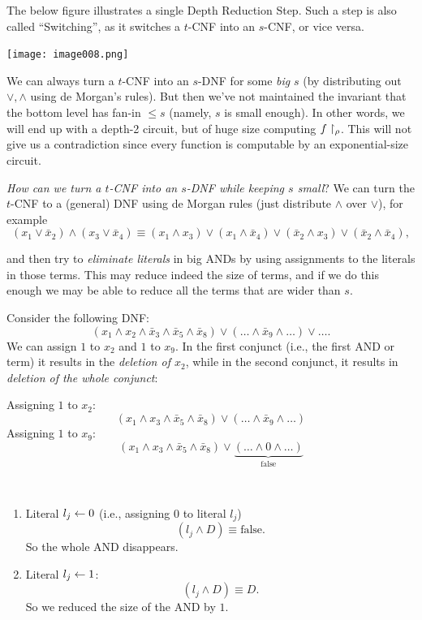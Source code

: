 The below figure illustrates a single Depth Reduction Step. Such a step is also called  ``Switching'', as it switches a $t$-CNF into an $s$-CNF, or vice versa.

\texttt{[image: image008.png]}

\begin{note} We can always turn a $t$-CNF into an $s$-DNF for some \textit{big} $s$ (by distributing out \(\lor, \land\) using de Morgan's rules).
But then we've not maintained the invariant that the bottom level has fan-in \(\leq s\) (namely, \(s\) is small enough).
In other words, we will end up with a depth-2 circuit, but of huge size computing \(f\upharpoonright_\rho\). This will not give us a contradiction since every function is computable by an exponential-size circuit.
\end{note}

\emph{How can we  turn a $t$-CNF into an $s$-DNF while keeping $s$ small}?
We can turn the $t$-CNF to a (general) DNF using de Morgan rules (just distribute $\wedge$ over $\vee$), for example
\[
(x_1 \vee \bar{x}_2) \wedge (x_3 \vee \bar{x}_4) \equiv (x_1 \wedge x_3) \vee (x_1 \wedge \bar{x}_4) \vee (\bar{x}_2 \wedge x_3) \vee (\bar{x}_2 \wedge \bar{x}_4),
\]

and then try to \emph{eliminate literals} in big ANDs by using assignments to the literals in those terms. This may reduce indeed the size of terms, and if we do this enough we may be able to reduce all the terms that are wider than $s$.
 
 
Consider the following DNF:
\[
(x_1 \wedge x_2 \wedge \bar{x}_3 \wedge \bar{x}_5 \wedge \bar{x}_8) \vee ( \dots \wedge \bar{x}_9 \wedge \dots)\lor\dots.
\] We can assign $1$ to $x_2$ and $1$ to $x_9$. In the first conjunct (i.e., the first AND or term) it results in the \emph{deletion of $x_2$}, while in the second conjunct, it results in \emph{deletion of the whole conjunct}:

Assigning $1$ to $x_2$:
\[
(x_1 \wedge x_3 \wedge \bar{x}_5 \wedge \bar{x}_8) \vee ( \dots \wedge \bar{x}_9 \wedge \dots )
\]
Assigning $1$ to $x_9$:
\[
(x_1 \wedge x_3 \wedge \bar{x}_5 \wedge \bar{x}_8) \vee \underbrace{( \dots\wedge 0 \wedge \dots)}_{\text{false}} 
\]





\begin{note}\
\begin{enumerate}
    \item Literal $l_j \leftarrow 0$ (i.e., assigning $0$ to literal $l_j$)
    \[
        (l_j \wedge D) \equiv \text{false}.
    \]
    So the whole AND disappears.
    
    \item Literal $l_j \leftarrow 1$:
    \[
        (l_j \wedge D) \equiv D.
    \]
    So we reduced the size of the AND by $1$.
\end{enumerate}
\end{note}

